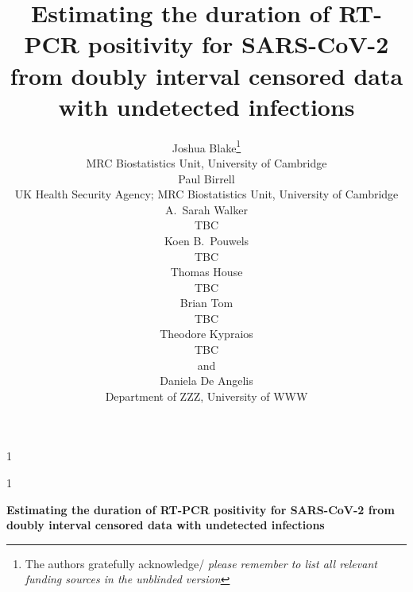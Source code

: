 \documentclass[12pt]{article}
\newcommand{\blind}{1}
\newcommand{\fulltitle}{Estimating the duration of RT-PCR positivity for SARS-CoV-2 from doubly interval censored data with undetected infections}
\begin{document}
%

\def\spacingset#1{\renewcommand{\baselinestretch}%
{#1}\small\normalsize} \spacingset{1}



\blind
{
  \title{\bf \fulltitle}
  \author{%
    Joshua Blake\thanks{
    The authors gratefully acknowledge/ \textit{please remember to list all relevant funding sources in the unblinded version}}\hspace{.2cm}\\
    MRC Biostatistics Unit, University of Cambridge \\
    Paul Birrell \\
    UK Health Security Agency; MRC Biostatistics Unit, University of Cambridge \\
    A.\ Sarah Walker \\
    TBC \\
    Koen B.\ Pouwels \\
    TBC \\
    Thomas House \\
    TBC \\
    Brian Tom \\
    TBC \\
    Theodore Kypraios \\
    TBC \\
    and \\
    Daniela De Angelis \\
    Department of ZZZ, University of WWW
  }
  \maketitle
} \fi

\blind
{
  \bigskip
  \bigskip
  \bigskip
  \begin{center}
    {\LARGE\bf \fulltitle}
\end{center}
  \medskip
} \fi
\end{document}

